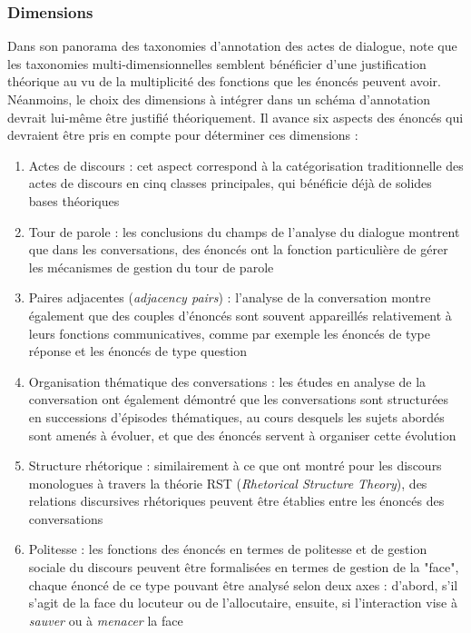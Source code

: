 \documentclass[10pt,a4paper,twoside]{article}
\begin{document}
\subsubsection{Dimensions}
\label{subsubsec:dimensions}

Dans son panorama des taxonomies d'annotation des actes de dialogue, \citet{popescu2005dialogue} note que les taxonomies multi-dimensionnelles semblent bénéficier d'une justification théorique au vu de la multiplicité des fonctions que les énoncés peuvent avoir. Néanmoins, le choix des dimensions à intégrer dans un schéma d'annotation devrait lui-même être justifié théoriquement. Il avance six aspects des énoncés qui devraient être pris en compte pour déterminer ces dimensions :

\begin{enumerate}
	\item Actes de discours : cet aspect correspond à la catégorisation traditionnelle des actes de discours en cinq classes principales, qui bénéficie déjà de solides bases théoriques \cite{austin1975how}
	\item Tour de parole : les conclusions du champs de l'analyse du dialogue montrent que dans les conversations, des énoncés ont la fonction particulière de gérer les mécanismes de gestion du tour de parole \cite{shriberg2004icsi}
	\item Paires adjacentes (\textit{adjacency pairs}) : l'analyse de la conversation montre également que des couples d'énoncés sont souvent appareillés relativement à leurs fonctions communicatives, comme par exemple les énoncés de type \og réponse \fg et les énoncés de type \og question \fg{} \cite{levinson1983pragmatics,schegloff1973opening}
	\item Organisation thématique des conversations : les études en analyse de la conversation ont également démontré que les conversations sont structurées en successions d'épisodes thématiques, au cours desquels les sujets abordés sont amenés à évoluer, et que des énoncés servent à organiser cette évolution \cite{schegloff1973opening}
	\item Structure rhétorique : similairement à ce que \citet{thompson1987rhetorical} ont montré pour les discours monologues à travers la théorie RST (\textit{Rhetorical Structure Theory}), des relations discursives rhétoriques peuvent être établies entre les énoncés des conversations \cite{asher2003logics}
	\item Politesse : les fonctions des énoncés en termes de politesse et de gestion sociale du discours peuvent être formalisées en termes de gestion de la "face", chaque énoncé de ce type pouvant être analysé selon deux axes : d'abord, s'il s'agit de la face du locuteur ou de l'allocutaire, ensuite, si l'interaction vise à \textit{sauver} ou à \textit{menacer} la face \cite{brown1987politeness}
\end{enumerate}
\end{document}
